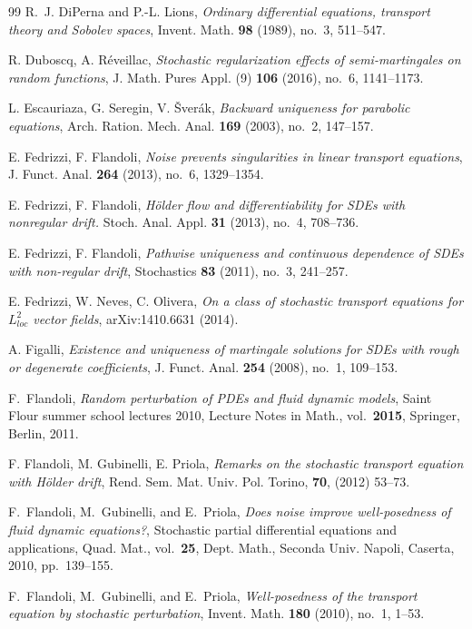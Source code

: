 \documentclass[a4paper,10pt]{article}
\newcommand\1{\mathbbm{1}}
\numberwithin{equation}{section}
\begin{document}
\begin{thebibliography}{99}
R.~J. DiPerna and P.-L. Lions, \textit{Ordinary differential equations, transport
  theory and {S}obolev spaces}, Invent. Math. \textbf{{\bf 98}} (1989), no.~3, 511--547.

R. Duboscq, A. R\'{e}veillac, \textit{Stochastic regularization effects of semi-martingales on random functions}, J. Math. Pures Appl. (9) \textbf{106} (2016), no.~6, 1141--1173.

L. Escauriaza, G. Seregin, V. \v{S}ver\'{a}k, \textit{Backward uniqueness for
parabolic equations}, Arch. Ration. Mech. Anal. \textbf{169} (2003), no.~2, 147--157.

 E. Fedrizzi, F. Flandoli, \textit{Noise prevents singularities in linear transport equations}, J. Funct. Anal. \textbf{264} (2013), no.~6, 1329--1354.

E. Fedrizzi, F. Flandoli, \textit{H\"older flow and differentiability for SDEs with nonregular drift.} Stoch. Anal. Appl. \textbf{31} (2013), no.~4, 708--736.

 E. Fedrizzi, F. Flandoli, \textit{Pathwise uniqueness and continuous dependence of {SDE}s with non-regular drift}, Stochastics \textbf{83} (2011), no.~3, 241--257.

E. Fedrizzi, W. Neves, C. Olivera, \textit{On a class of stochastic transport equations for $L^2_{loc}$ vector fields}, arXiv:1410.6631 (2014).

 A. Figalli, \textit{Existence and uniqueness of martingale solutions for SDEs with rough or degenerate coefficients}, J. Funct. Anal. \textbf{254} (2008), no.~1, 109--153.

F.~Flandoli, \textit{Random perturbation of {PDE}s and fluid dynamic models},
  Saint Flour summer school lectures 2010, Lecture Notes in Math., vol.~{\bf2015}, Springer, Berlin, 2011.

F. Flandoli, M. Gubinelli, E. Priola, \textit{Remarks on the stochastic transport equation with H\"{o}lder drift}, Rend. Sem. Mat. Univ. Pol. Torino, \textbf{70}, (2012) 53--73.

F.~Flandoli, M.~Gubinelli, and E.~Priola, \textit{Does noise improve well-posedness of fluid dynamic equations?}, 
Stochastic partial differential equations and applications, Quad. Mat., vol.~{\bf25}, Dept. Math., Seconda
  Univ. Napoli, Caserta, 2010, pp.~139--155.

F.~Flandoli, M.~Gubinelli, and E.~Priola, \textit{Well-posedness of the transport equation by stochastic perturbation}, Invent. Math. \textbf{{\bf180}} (2010), no.~1, 1--53.


\end{thebibliography}
\end{document}
